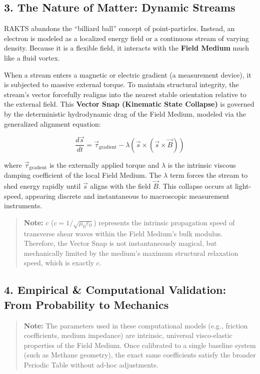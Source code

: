 \documentclass[twocolumn]{article}
\begin{document}
\subsection{3. The Nature of Matter: Dynamic
Streams}\label{the-nature-of-matter-dynamic-streams}

RAKTS abandons the ``billiard ball'' concept of point-particles.
Instead, an electron is modeled as a localized energy field or a
continuous stream of varying density. Because it is a flexible field, it
interacts with the \textbf{Field Medium} much like a fluid vortex.

When a stream enters a magnetic or electric gradient (a measurement
device), it is subjected to massive external torque. To maintain
structural integrity, the stream's vector forcefully realigns into the
nearest stable orientation relative to the external field. This
\textbf{Vector Snap (Kinematic State Collapse)} is governed by the
deterministic hydrodynamic drag of the Field Medium, modeled via the
generalized alignment equation:

\[ \frac{d\vec{s}}{dt} = \vec{\tau}_{\text{gradient}} - \lambda \left( \vec{s} \times (\vec{s} \times \vec{B}) \right) \]

where \(\vec{\tau}_{\text{gradient}}\) is the externally applied torque
and \(\lambda\) is the intrinsic viscous damping coefficient of the
local Field Medium. The \(\lambda\) term forces the stream to shed
energy rapidly until \(\vec{s}\) aligns with the field \(\vec{B}\). This
collapse occurs at light-speed, appearing discrete and instantaneous to
macroscopic measurement instruments.

\begin{quote}
\textbf{Note:} \(c\) (\(c = 1/\sqrt{\mu_0 \varepsilon_0}\)) represents
the intrinsic propagation speed of transverse shear waves within the
Field Medium's bulk modulus. Therefore, the Vector Snap is not
instantaneously magical, but mechanically limited by the medium's
maximum structural relaxation speed, which is exactly \(c\).
\end{quote}

\subsection{4. Empirical \& Computational Validation: From Probability
to
Mechanics}\label{empirical-computational-validation-from-probability-to-mechanics}

\begin{quote}
\textbf{Note:} The parameters used in these computational models (e.g.,
friction coefficients, medium impedance) are intrinsic, universal
visco-elastic properties of the Field Medium. Once calibrated to a
single baseline system (such as Methane geometry), the exact same
coefficients satisfy the broader Periodic Table without ad-hoc
adjustments.
\end{quote}
\end{document}
